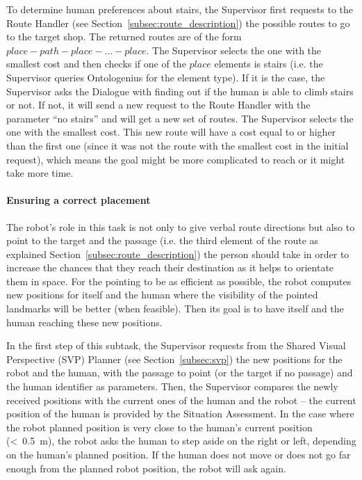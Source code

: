 \documentclass[a4paper,11pt,twoside]{StyleThese}
\begin{document}
To determine human preferences about stairs, the Supervisor first requests to the Route Handler (see Section~\ref{subsec:route_description}) the possible routes to go to the target shop. The returned routes are of the form $place - path - place - ... - place$. The Supervisor selects the one with the smallest cost and then checks if one of the $place$ elements is stairs (i.e. the Supervisor queries Ontologenius for the element type). If it is the case, the Supervisor asks the Dialogue with finding out if the human is able to climb stairs or not. If not, it will send a new request to the Route Handler with the parameter ``no stairs'' and will get a new set of routes. The Supervisor selects the one with the smallest cost. This new route will have a cost equal to or higher than the first one (since it was not the route with the smallest cost in the initial request), which means the goal might be more complicated to reach or it might take more time.

\paragraph{Ensuring a correct placement}
The robot's role in this task is not only to give verbal route directions but also to point to the target and the passage (i.e. the third element of the route as explained Section~\ref{subsec:route_description}) the person should take in order to increase the chances that they reach their destination as it helps to orientate them in space. For the pointing to be as efficient as possible, the robot computes new positions for itself and the human where the visibility of the pointed landmarks will be better (when feasible). Then its goal is to have itself and the human reaching these new positions. 

In the first step of this subtask, the Supervisor requests from the Shared Visual Perspective (SVP) Planner (see Section~\ref{subsec:svp}) the new positions for the robot and the human, with the passage to point (or the target if no passage) and the human identifier as parameters. Then, the Supervisor compares the newly received positions with the current ones of the human and the robot -- the current position of the human is provided by the Situation Assessment. In the case where the robot planned position is very close to the human's current position (\textless~0.5~m), the robot asks the human to step aside on the right or left, depending on the human's planned position. If the human does not move or does not go far enough from the planned robot position, the robot will ask again.
\end{document}
